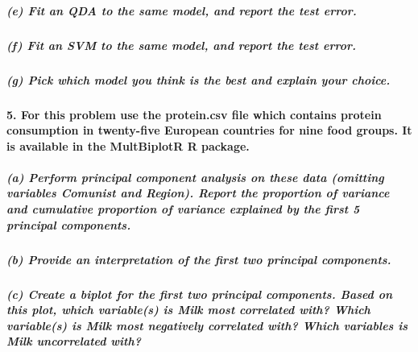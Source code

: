 \documentclass[
]{article}
\begin{document}
\hypertarget{e-fit-an-qda-to-the-same-model-and-report-the-test-error.}{%
\subparagraph{(e) Fit an QDA to the same model, and report the test
error.}\label{e-fit-an-qda-to-the-same-model-and-report-the-test-error.}}

\hypertarget{f-fit-an-svm-to-the-same-model-and-report-the-test-error.}{%
\subparagraph{(f) Fit an SVM to the same model, and report the test
error.}\label{f-fit-an-svm-to-the-same-model-and-report-the-test-error.}}

\hypertarget{g-pick-which-model-you-think-is-the-best-and-explain-your-choice.}{%
\subparagraph{(g) Pick which model you think is the best and explain
your
choice.}\label{g-pick-which-model-you-think-is-the-best-and-explain-your-choice.}}

\hypertarget{for-this-problem-use-the-protein.csv-file-which-contains-protein-consumption-in-twenty-five-european-countries-for-nine-food-groups.-it-is-available-in-the-multbiplotr-r-package.}{%
\paragraph{5. For this problem use the protein.csv file which contains
protein consumption in twenty-five European countries for nine food
groups. It is available in the MultBiplotR R
package.}\label{for-this-problem-use-the-protein.csv-file-which-contains-protein-consumption-in-twenty-five-european-countries-for-nine-food-groups.-it-is-available-in-the-multbiplotr-r-package.}}

\hypertarget{a-perform-principal-component-analysis-on-these-data-omitting-variables-comunist-and-region.-report-the-proportion-of-variance-and-cumulative-proportion-of-variance-explained-by-the-first-5-principal-components.}{%
\subparagraph{(a) Perform principal component analysis on these data
(omitting variables Comunist and Region). Report the proportion of
variance and cumulative proportion of variance explained by the first 5
principal
components.}\label{a-perform-principal-component-analysis-on-these-data-omitting-variables-comunist-and-region.-report-the-proportion-of-variance-and-cumulative-proportion-of-variance-explained-by-the-first-5-principal-components.}}

\hypertarget{b-provide-an-interpretation-of-the-first-two-principal-components.}{%
\subparagraph{(b) Provide an interpretation of the first two principal
components.}\label{b-provide-an-interpretation-of-the-first-two-principal-components.}}

\hypertarget{c-create-a-biplot-for-the-first-two-principal-components.-based-on-this-plot-which-variables-is-milk-most-correlated-with-which-variables-is-milk-most-negatively-correlated-with-which-variables-is-milk-uncorrelated-with}{%
\subparagraph{(c) Create a biplot for the first two principal
components. Based on this plot, which variable(s) is Milk most
correlated with? Which variable(s) is Milk most negatively correlated
with? Which variables is Milk uncorrelated
with?}\label{c-create-a-biplot-for-the-first-two-principal-components.-based-on-this-plot-which-variables-is-milk-most-correlated-with-which-variables-is-milk-most-negatively-correlated-with-which-variables-is-milk-uncorrelated-with}}
\end{document}

